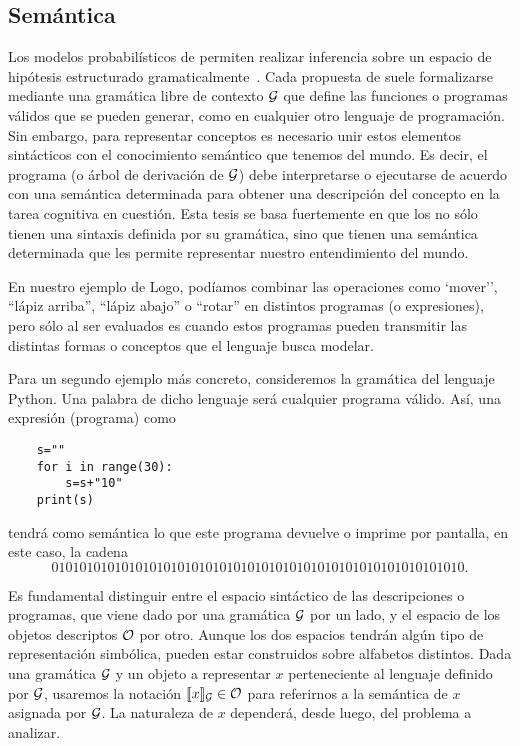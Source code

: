 \subsection{Semántica}\label{sub:semantica}

Los modelos probabilísticos de \lot permiten realizar inferencia sobre un espacio de hipótesis estructurado gramaticalmente~\cite{goodman2008rational}. Cada propuesta de \lot suele formalizarse mediante una gramática libre de contexto $ \gram $ que define las funciones o programas válidos que se pueden generar, como en cualquier otro lenguaje de programación. Sin embargo, para representar conceptos es necesario unir estos elementos sintácticos con el conocimiento semántico que tenemos del mundo. Es decir, el programa (o árbol de derivación de $ \gram $) debe interpretarse o ejecutarse de acuerdo con una semántica determinada para obtener una descripción del concepto en la tarea cognitiva en cuestión. Esta tesis se basa fuertemente en que los \lot no sólo tienen una sintaxis definida por su gramática, sino que tienen una semántica determinada que les permite representar nuestro entendimiento del mundo.

En nuestro ejemplo de Logo, podíamos combinar las operaciones como `mover'', ``lápiz arriba'', ``lápiz abajo'' o ``rotar'' en distintos programas (o expresiones), pero sólo al ser evaluados es cuando estos programas pueden transmitir las distintas formas o conceptos que el lenguaje busca modelar.



Para un segundo ejemplo más concreto, consideremos la gramática del lenguaje Python. Una palabra de dicho lenguaje será cualquier programa válido. Así, una expresión (programa) como 
%
\begin{verbatim}
    s=""
    for i in range(30):
        s=s+"10"
    print(s)
\end{verbatim}
%
tendrá como semántica lo que este programa devuelve o imprime por pantalla, en este caso, la cadena
$$
01010101010101010101010101010101010101010101010101010101010.
$$

Es fundamental distinguir entre el espacio sintáctico de las descripciones o programas, que viene dado por una gramática $\gram$ por un lado, y el espacio de los objetos descriptos $\+O$ por otro. Aunque los dos espacios tendrán algún tipo de representación simbólica, pueden estar construidos sobre alfabetos distintos. Dada una gramática $\gram$ y un objeto a representar $x$ perteneciente al lenguaje definido por $\gram$, usaremos la notación $\sem{x}_\gram\in\+O$ para referirnos a la semántica de $x$ asignada por $\gram$. La naturaleza de $x$ dependerá, desde luego, del problema a analizar. 

